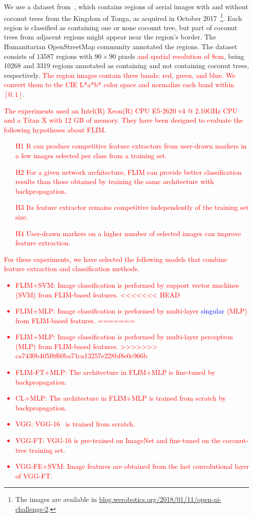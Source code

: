 \documentclass[journal, twoside]{IEEEtran}
\begin{document}
We use a dataset from~\cite{8899005}, which contains regions of aerial images with and without coconut trees from the Kingdom of Tonga, as acquired in October 2017~\footnote{The images are available in \url{blog.werobotics.org/2018/01/11/open-ai-challenge-2}.}. Each region is classified as containing one or none coconut tree, but part of coconut trees from adjacent regions might appear near the region's border. The Humanitarian OpenStreetMap community annotated the regions. The dataset consists of 13587 regions with $90 \times 90$ pixels \textcolor{red}{and spatial resolution of $8$\si{\centi\metre}}, being 10268 and 3319 regions annotated as containing and not containing coconut trees, respectively. \textcolor{red}{The region images contain three bands: red, green, and blue. We convert them to the CIE L*a*b* color space and normalize each band within $[0,1]$}.

\textcolor{red}{The experiments used an Intel(R) Xeon(R) CPU E5-2620 v4 @ 2.10GHz CPU and a Titan X with 12 GB of memory. They have been designed to evaluate the following hypotheses about FLIM.
\begin{enumerate}
  \item[H1]  It can produce competitive feature extractors from user-drawn markers in a few images selected per class from a training set. 
  \item[H2]  For a given network architecture, FLIM can provide better classification results than those obtained by training the same architecture with backpropagation.
  \item[H3] Its feature extractor remains competitive independently of the training set size. 
  \item[H4] User-drawn markers on a higher number of selected images can improve feature extraction.
\end{enumerate}
}

\textcolor{red}{For these experiments, we have selected the following models that combine feature extraction and classification methods.
 \begin{itemize}
\item FLIM+SVM: Image classification is performed by support vector machines (SVM) from FLIM-based features.  
<<<<<<< HEAD
\item FLIM+MLP: Image classification is performed by multi-layer \textcolor{blue}{singular} (MLP) from FLIM-based features.  
=======
\item FLIM+MLP: Image classification is performed by multi-layer perceptron (MLP) from FLIM-based features.  
>>>>>>> ca7430b405f8f60ba71ca13257e228bf8e0c966b
\item FLIM-FT+MLP: The architecture in FLIM+MLP is fine-tuned by backpropagation. 
\item CL+MLP: The architecture in FLIM+MLP is trained from scratch by backpropagation.
\item VGG: VGG-16~\cite{simonyan2014very} is trained from scratch.
\item VGG-FT: VGG-16 is pre-trained on ImageNet and fine-tuned on the coconut-tree training set.
\item VGG-FE+SVM: Image features are obtained from the last convolutional layer of VGG-FT.
\end{itemize}
}
\end{document}
